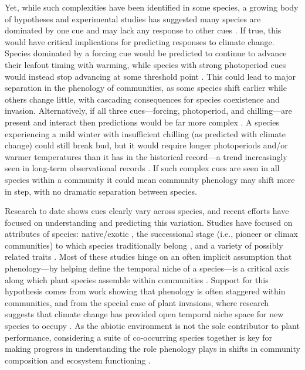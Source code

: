 \documentclass[11pt]{article}
\begin{document}
Yet, while such complexities have been identified in some species, a growing body of hypotheses and experimental studies has suggested many species are dominated by one cue and may lack any response to other cues \citep{Korner:2010}. If true, this would have critical implications for predicting responses to climate change. Species dominated by a forcing cue would be predicted to continue to advance their leafout timing with warming, while species with strong photoperiod cues would instead stop advancing at some threshold point \citep{Korner:2010}. This could lead to major separation in the phenology of communities, as some species shift earlier while others change little, with cascading consequences for species coexistence and invasion. Alternatively, if all three cues---forcing, photoperiod, and chilling---are present and interact then predictions would be far more complex \citep{Chuine:1999aa}. A species experiencing a mild winter with insufficient chilling (as predicted with climate change) could still break bud, but it would require longer photoperiods and/or warmer temperatures \citep{Heide:1993b} than it has in the historical record---a trend increasingly seen in long-term observational records \citep[e.g,][]{fu2015,carter2017}. If such complex cues are seen in all species within a community it could mean community phenology may shift more in step, with no dramatic separation between species.

Research to date shows cues clearly vary across species, and recent efforts have focused on understanding and predicting this variation. Studies have focused on attributes of species: native/exotic \citep{Willis:2010al}, the successional stage (i.e., pioneer or climax communities) to which species traditionally belong \citep{Basler:2012aa,laube2014gcb}, and a variety of possibly related traits \citep{Lechowicz:1984aa,Polgar:2014aa}. Most of these studies hinge on an often implicit assumption that phenology---by helping define the temporal niche of a species---is a critical axis along which plant species assemble within communities \citep{gotelli1996,Loreau:2008xy}. Support for this hypothesis comes from work showing that phenology is often staggered within communities, and from the special case of plant invasions, where research suggests that climate change has provided open temporal niche space for new species to occupy \citep{Willis:2010al,wolkovichAmBot2013}. As the abiotic environment is not the sole contributor to plant performance, considering a suite of co-occurring species together is key for making progress in understanding the role phenology plays in shifts in community composition and ecosystem functioning \citep{Cleland:2007aa}. 
\end{document}
